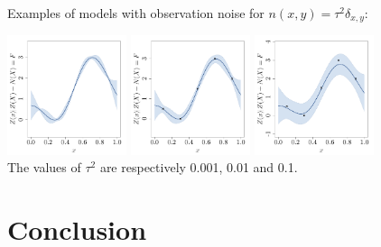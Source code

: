 \documentclass{beamer}
\begin{document}
\begin{frame}{}
Examples of models with observation noise for $n(x,y)=\tau^2 \delta_{x,y}$:
\begin{center}
\includegraphics[height=3.5cm]{figures/R/ch34_GPRnoise0001} 
\includegraphics[height=3.5cm]{figures/R/ch34_GPRnoise001} 
\includegraphics[height=3.5cm]{figures/R/ch34_GPRnoise01}\\
The values of $\tau^2$ are respectively 0.001, 0.01 and 0.1.
\end{center}
\end{frame}


\section{Conclusion}
\subsection{}
\end{document}
